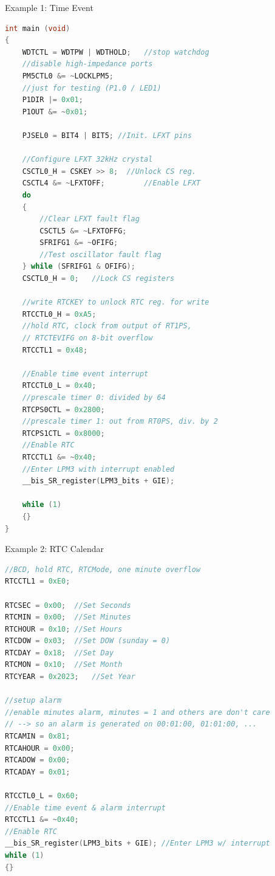 Example 1: Time Event
\begin{lstlisting}[language=C]
int main (void)
{
	WDTCTL = WDTPW | WDTHOLD;	//stop watchdog
	//disable high-impedance ports
	PM5CTL0 &= ~LOCKLPM5;
	//just for testing (P1.0 / LED1)
	P1DIR |= 0x01;
	P1OUT &= ~0x01;
	
	PJSEL0 = BIT4 | BIT5; //Init. LFXT pins
		
	//Configure LFXT 32kHz crystal
	CSCTL0_H = CSKEY >> 8;	//Unlock CS reg.
	CSCTL4 &= ~LFXTOFF;			//Enable LFXT
	do
	{
		//Clear LFXT fault flag
		CSCTL5 &= ~LFXTOFFG;
		SFRIFG1 &= ~OFIFG;
		//Test oscillator fault flag
	} while (SFRIFG1 & OFIFG);
	CSCTL0_H = 0;	//Lock CS registers
		
	//write RTCKEY to unlock RTC reg. for write
	RTCCTL0_H = 0xA5;
	//hold RTC, clock from output of RT1PS,
	// RTCTEVIFG on 8-bit overflow
	RTCCTL1 = 0x48;
		
	//Enable time event interrupt
	RTCCTL0_L = 0x40;
	//prescale timer 0: divided by 64
	RTCPS0CTL = 0x2800;
	//prescale timer 1: out from RT0PS, div. by 2
	RTCPS1CTL = 0x8000;
	//Enable RTC
	RTCCTL1 &= ~0x40;
	//Enter LPM3 with interrupt enabled
	__bis_SR_register(LPM3_bits + GIE);
		
	while (1)
	{}
}
\end{lstlisting}

Example 2: RTC Calendar
\begin{lstlisting}[language=C]
//BCD, hold RTC, RTCMode, one minute overflow
RTCCTL1 = 0xE0;

RTCSEC = 0x00;	//Set Seconds
RTCMIN = 0x00;	//Set Minutes
RTCHOUR = 0x10;	//Set Hours
RTCDOW = 0x03;	//Set DOW (sunday = 0)
RTCDAY = 0x18;	//Set Day
RTCMON = 0x10;	//Set Month
RTCYEAR = 0x2023;	//Set Year

//setup alarm
//enable minutes alarm, minutes = 1 and others are don't care
// --> so an alarm is generated on 00:01:00, 01:01:00, ...
RTCAMIN = 0x81;
RTCAHOUR = 0x00;
RTCADOW = 0x00;
RTCADAY = 0x01;

RTCCTL0_L = 0x60;
//Enable time event & alarm interrupt
RTCCTL1 &= ~0x40;
//Enable RTC
__bis_SR_register(LPM3_bits + GIE); //Enter LPM3 w/ interrupt
while (1)
{}
\end{lstlisting}




